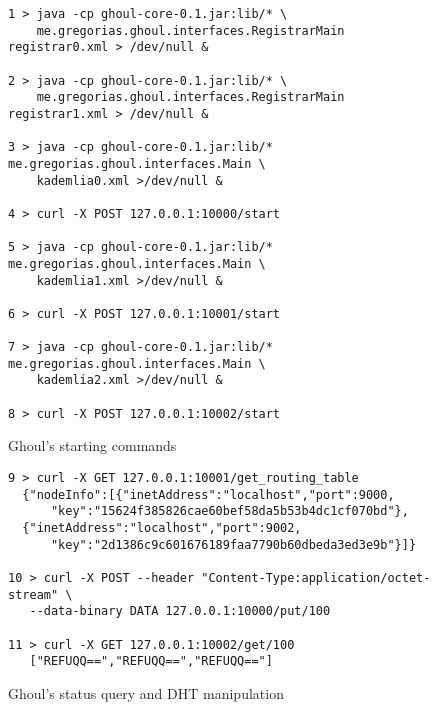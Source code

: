 \begin{figure}[tbp]
\begin{verbatim}
1 > java -cp ghoul-core-0.1.jar:lib/* \
    me.gregorias.ghoul.interfaces.RegistrarMain registrar0.xml > /dev/null &

2 > java -cp ghoul-core-0.1.jar:lib/* \
    me.gregorias.ghoul.interfaces.RegistrarMain registrar1.xml > /dev/null &

3 > java -cp ghoul-core-0.1.jar:lib/* me.gregorias.ghoul.interfaces.Main \
    kademlia0.xml >/dev/null &

4 > curl -X POST 127.0.0.1:10000/start

5 > java -cp ghoul-core-0.1.jar:lib/* me.gregorias.ghoul.interfaces.Main \
    kademlia1.xml >/dev/null &

6 > curl -X POST 127.0.0.1:10001/start

7 > java -cp ghoul-core-0.1.jar:lib/* me.gregorias.ghoul.interfaces.Main \
    kademlia2.xml >/dev/null &

8 > curl -X POST 127.0.0.1:10002/start
\end{verbatim}
\caption{Ghoul's starting commands}
\label{fig:ghoul_manual_run}
\end{figure}

\begin{figure}[tbp]
\begin{verbatim}
9 > curl -X GET 127.0.0.1:10001/get_routing_table
  {"nodeInfo":[{"inetAddress":"localhost","port":9000,
      "key":"15624f385826cae60bef58da5b53b4dc1cf070bd"},
  {"inetAddress":"localhost","port":9002,
      "key":"2d1386c9c601676189faa7790b60dbeda3ed3e9b"}]}

10 > curl -X POST --header "Content-Type:application/octet-stream" \
   --data-binary DATA 127.0.0.1:10000/put/100

11 > curl -X GET 127.0.0.1:10002/get/100
   ["REFUQQ==","REFUQQ==","REFUQQ=="]
\end{verbatim}
\caption{Ghoul's status query and DHT manipulation}
\label{fig:ghoul_manipulation}
\end{figure}
